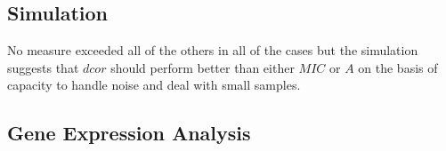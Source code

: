 \documentclass[a4paper, landscape, 20pt]{extreport}
\begin{document}
\subsection*{\color{Blue} Simulation}

\begin{figure}[H]
    \centering
    \qquad
\end{figure}

No measure exceeded all of the others in all of the cases but the simulation suggests that $dcor$ should perform better than either $MIC$ or $A$ on the basis of capacity to handle noise and deal with small samples. 

\newpage
\subsection*{\color{Blue} Gene Expression Analysis}
\end{document}
